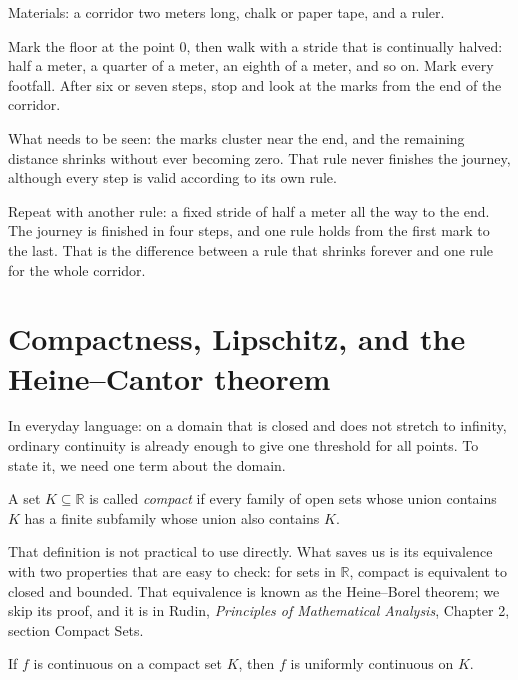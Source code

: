 \begin{tangan}
Materials: a corridor two meters long, chalk or paper tape, and a ruler.

Mark the floor at the point $0$, then walk with a stride that is continually halved:
half a meter, a quarter of a meter, an eighth of a meter, and so on. Mark every
footfall. After six or seven steps, stop and look at the marks from the end of the
corridor.

What needs to be seen: the marks cluster near the end, and the remaining distance shrinks
without ever becoming zero. That rule never finishes the journey, although every step is
valid according to its own rule.

Repeat with another rule: a fixed stride of half a meter all the way to the end. The
journey is finished in four steps, and one rule holds from the first mark to the last.
That is the difference between a rule that shrinks forever and one rule for the whole
corridor.
\end{tangan}

\section{Compactness, Lipschitz, and the Heine--Cantor theorem}

In everyday language: on a domain that is closed and does not stretch to infinity,
ordinary continuity is already enough to give one threshold for all points. To state it,
we need one term about the domain.


\begin{definisi}[Compact]
A set $K\subseteq\mathbb{R}$ is called \emph{compact} if every family of open sets whose
union contains $K$ has a finite subfamily whose union also contains $K$.
\end{definisi}

That definition is not practical to use directly. What saves us is its equivalence with
two properties that are easy to check: for sets in $\mathbb{R}$, compact is equivalent to
closed and bounded. That equivalence is known as the Heine--Borel theorem; we skip its
proof, and it is in Rudin, \emph{Principles of Mathematical Analysis}, Chapter 2, section
Compact Sets.

\begin{teorema}
If $f$ is continuous on a compact set $K$, then $f$ is uniformly continuous on $K$.
\end{teorema}

